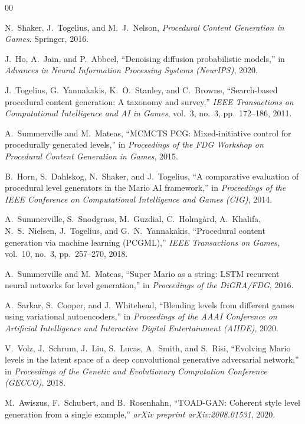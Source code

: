 \documentclass[conference]{IEEEtran}
\begin{document}
\begin{thebibliography}{00}

N.~Shaker, J.~Togelius, and M.~J.~Nelson, \textit{Procedural Content Generation in Games}. Springer, 2016.

J.~Ho, A.~Jain, and P.~Abbeel, ``Denoising diffusion probabilistic models,'' in \textit{Advances in Neural Information Processing Systems (NeurIPS)}, 2020.

J.~Togelius, G.~Yannakakis, K.~O.~Stanley, and C.~Browne, ``Search-based procedural content generation: A taxonomy and survey,'' \textit{IEEE Transactions on Computational Intelligence and AI in Games}, vol.~3, no.~3, pp.~172--186, 2011.

A.~Summerville and M.~Mateas, ``MCMCTS PCG: Mixed-initiative control for procedurally generated levels,'' in \textit{Proceedings of the FDG Workshop on Procedural Content Generation in Games}, 2015.

B.~Horn, S.~Dahlskog, N.~Shaker, and J.~Togelius, ``A comparative evaluation of procedural level generators in the Mario AI framework,'' in \textit{Proceedings of the IEEE Conference on Computational Intelligence and Games (CIG)}, 2014.

A.~Summerville, S.~Snodgrass, M.~Guzdial, C.~Holmgård, A.~Khalifa, N.~S.~Nielsen, J.~Togelius, and G.~N.~Yannakakis, ``Procedural content generation via machine learning (PCGML),'' \textit{IEEE Transactions on Games}, vol.~10, no.~3, pp.~257--270, 2018.

A.~Summerville and M.~Mateas, ``Super Mario as a string: LSTM recurrent neural networks for level generation,'' in \textit{Proceedings of the DiGRA/FDG}, 2016.

A.~Sarkar, S.~Cooper, and J.~Whitehead, ``Blending levels from different games using variational autoencoders,'' in \textit{Proceedings of the AAAI Conference on Artificial Intelligence and Interactive Digital Entertainment (AIIDE)}, 2020.

V.~Volz, J.~Schrum, J.~Liu, S.~Lucas, A.~Smith, and S.~Risi, ``Evolving Mario levels in the latent space of a deep convolutional generative adversarial network,'' in \textit{Proceedings of the Genetic and Evolutionary Computation Conference (GECCO)}, 2018.

M.~Awiszus, F.~Schubert, and B.~Rosenhahn, ``TOAD-GAN: Coherent style level generation from a single example,'' \textit{arXiv preprint arXiv:2008.01531}, 2020.


\end{thebibliography}
\end{document}
